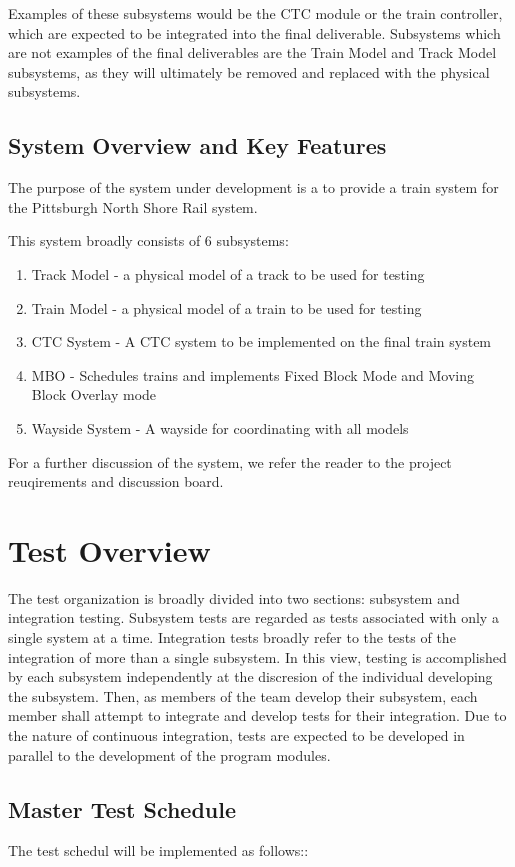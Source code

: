 \documentclass[]{article}
\begin{document}
Examples of these subsystems would be the CTC module or the train controller, which are expected to be integrated into the final deliverable. Subsystems which are not examples of the final deliverables are the Train Model and Track Model subsystems, as they will ultimately be removed and replaced with the physical subsystems.

\subsection{System Overview and Key Features}
The purpose of the system under development is a to provide a train system for the Pittsburgh North Shore Rail system.

This system broadly consists of 6 subsystems:
\begin{enumerate}
	\item  Track Model - a physical model of a track to be used for testing
	\item Train Model - a physical model of a train to be used for testing
	\item CTC System - A CTC system to be implemented on the final train system
	\item MBO - Schedules trains and implements Fixed Block Mode and Moving Block Overlay mode
	\item Wayside System - A wayside for coordinating with all models
\end{enumerate}
For a further discussion of the system, we refer the reader to the project reuqirements and discussion board.

\section{Test Overview}
The test organization is broadly divided into two sections: subsystem and integration testing. Subsystem tests are regarded as tests associated with only a single system at a time. Integration tests broadly refer to the tests of the integration of more than a single subsystem. In this view, testing is accomplished by each subsystem independently at the discresion of the individual developing the subsystem. Then, as members of the team develop their subsystem, each member shall attempt to integrate and develop tests for their integration. Due to the nature of continuous integration, tests are expected to be developed in parallel to the development of the program modules. 

\subsection{Master Test Schedule}
The test schedul will be implemented as follows::
\end{document}

